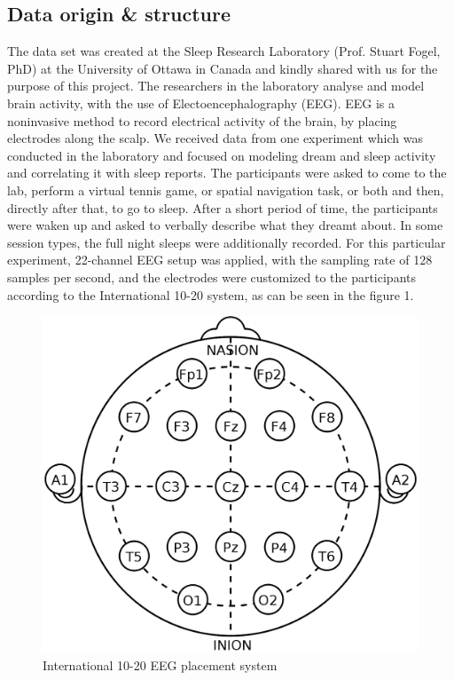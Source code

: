 \documentclass{article}
\begin{document}
\subsection{Data origin \& structure}
\label{ssec:data_structure}
The data set was created at the Sleep Research Laboratory (Prof. Stuart Fogel, PhD) at the University of Ottawa in Canada and kindly shared with us for the purpose of this project. The researchers in the laboratory analyse and model brain activity, with the use of Electoencephalography (EEG). EEG is a noninvasive method to record electrical activity of the brain, by placing electrodes along the scalp. We received data from one experiment which was conducted in the laboratory and focused on modeling dream and sleep activity and correlating it with sleep reports. The participants were asked to come to the lab, perform a virtual tennis game, or spatial navigation task, or both and then, directly after that, to go to sleep. After a short period of time, the participants were waken up and asked to verbally describe what they dreamt about. In some session types, the full night sleeps were additionally recorded. For this particular experiment, 22-channel EEG setup was applied, with the sampling rate of 128 samples per second, and the electrodes were customized to the participants according to the International 10-20 system, as can be seen in the figure 1.
\begin{figure}[!ht]
	\centering
	\includegraphics[scale=0.1]{eeg}
	\caption{International 10-20 EEG placement system}
\end{figure} 
\end{document}
